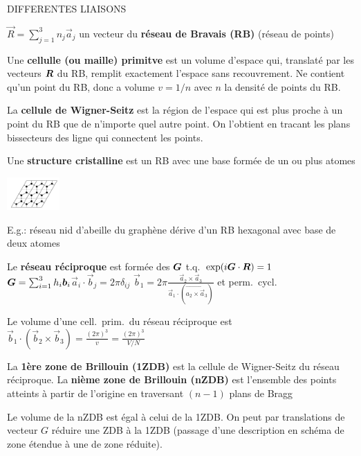 \begin{squishlist}
    \item DIFFERENTES LIAISONS
\end{squishlist}
\begin{squishlist}
    \item $\vec{R} = \sum_{j=1}^{3} n_j \vec{a}_j$ un vecteur du \textbf{réseau de Bravais (RB)} (réseau de points)
    \item Une \textbf{cellulle (ou maille) primitve} est un volume d'espace qui, translaté par les vecteurs $\bm{R}$ du RB, remplit exactement l'espace sans recouvrement. Ne contient qu'un point du RB, donc a volume $v = 1/n$ avec $n$ la densité de points du RB.
    \item La \textbf{cellule de Wigner-Seitz} est la région de l'espace qui est plus proche à un point du RB que de n'importe quel autre point. On l'obtient en tracant les plans bissecteurs des ligne qui connectent les points.
    \item Une \textbf{structure cristalline} est un RB avec une base formée de un ou plus atomes
    \begin{minipage}{.25\columnwidth}
        \includegraphics[width=2cm]{figures/abeille.png}
    \end{minipage}
    \begin{minipage}{.75\columnwidth}
        E.g.: réseau nid d'abeille du graphène dérive d'un RB hexagonal avec base de deux atomes
    \end{minipage}
    \item Le \textbf{réseau réciproque} est formée des $\bm{G}$ t.q.\ $\exp(i \bm{G} \cdot \bm{R}) = 1$ \\
    $\bm{G} = \sum_{i=1}^{3}h_i \bm{b}_i $\squishsep $\vec{a}_i \cdot \vec{b}_j = 2 \pi \delta_{ij}$ \squishsep $\vec{b}_1 = 2 \pi \frac{\vec{a}_2 \times \vec{a}_3}{\vec{a}_1 \cdot (\vec{a_2 \times \vec{a}_3})}$ et perm.\ cycl.\ 
    \item Le volume d'une cell.\ prim.\ du réseau réciproque est $\vec{b}_1 \cdot (\vec{b}_2 \times \vec{b}_3) = \frac{(2\pi)^3}{v} = \frac{(2\pi)^3}{V/N}$
\end{squishlist}    

\begin{squishlist}
    \item La \textbf{1ère zone de Brillouin (1ZDB)} est la cellule de Wigner-Seitz du réseau réciproque. La \textbf{nième zone de Brillouin (nZDB)} est l'ensemble des points atteints à partir de l'origine en traversant $(n-1)$ plans de Bragg
    \item Le volume de la nZDB est égal à celui de la 1ZDB. On peut par translations de vecteur $G$ réduire une ZDB à la 1ZDB (passage d'une description en schéma de zone étendue à une de zone réduite).
\end{squishlist}

